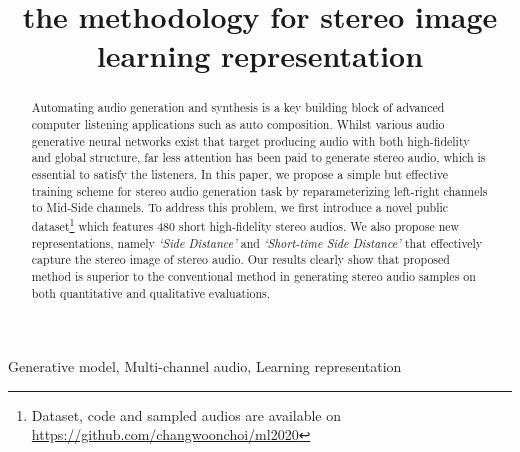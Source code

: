 \documentclass{article}
\title{the methodology for stereo image learning representation}
\begin{document}
\maketitle

\begin{abstract}
Automating audio generation and synthesis is a key building block of advanced computer listening applications such as auto composition. Whilst various audio generative neural networks exist that target producing audio with both high-fidelity and global structure, far less attention has been paid to generate stereo audio, which is essential to satisfy the listeners. In this paper, we propose a simple but effective training scheme for stereo audio generation task by reparameterizing left-right channels to Mid-Side channels. To address this problem, we first introduce a novel public dataset\footnote{Dataset, code and sampled audios are available on \url{https://github.com/changwoonchoi/ml2020}} which features 480 short high-fidelity stereo audios. We also propose new representations, namely \textit{`Side Distance'} and \textit{`Short-time Side Distance'} that effectively capture the stereo image of stereo audio. Our results clearly show that proposed method is superior to the conventional method in generating stereo audio samples on both quantitative and qualitative evaluations.
\end{abstract}

\begin{keywords}
Generative model, Multi-channel audio, Learning representation
\end{keywords}









\end{document}
